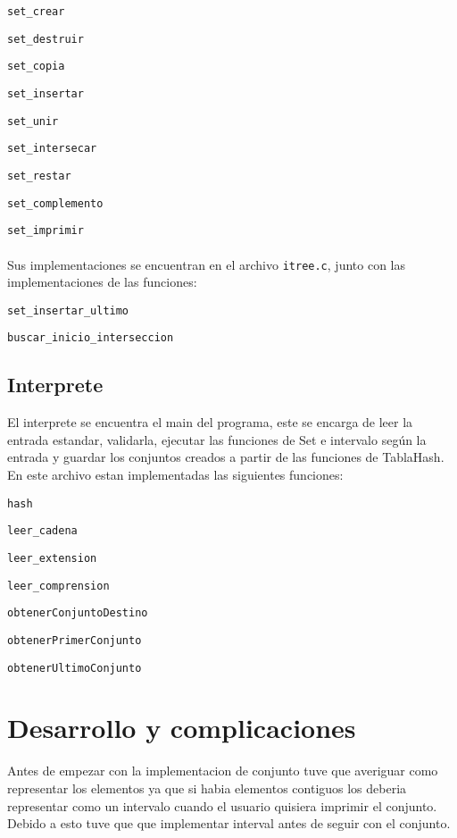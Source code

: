 \documentclass[]{article}
\begin{document}
\verb|set_crear|

\verb|set_destruir|

\verb|set_copia|

\verb|set_insertar|

\verb|set_unir|

\verb|set_intersecar|

\verb|set_restar|

\verb|set_complemento|

\verb|set_imprimir|\\\\
Sus implementaciones se encuentran en el archivo \verb|itree.c|, junto con las implementaciones de las funciones:

\verb|set_insertar_ultimo|

\verb|buscar_inicio_interseccion|

\subsection{Interprete}
El interprete se encuentra el main del programa, este se encarga de leer la entrada estandar, validarla, ejecutar las funciones de Set e intervalo según la entrada y guardar los conjuntos creados a partir de las funciones de TablaHash. En este archivo estan implementadas las siguientes funciones:

\verb|hash|

\verb|leer_cadena|

\verb|leer_extension|

\verb|leer_comprension|

\verb|obtenerConjuntoDestino|

\verb|obtenerPrimerConjunto|

\verb|obtenerUltimoConjunto|

\section{Desarrollo y complicaciones}
Antes de empezar con la implementacion de conjunto tuve que averiguar como representar los elementos ya que si habia elementos contiguos los deberia representar como un intervalo cuando el usuario quisiera imprimir el conjunto. Debido a esto tuve que que implementar interval antes de seguir con el conjunto. 
\end{document}
